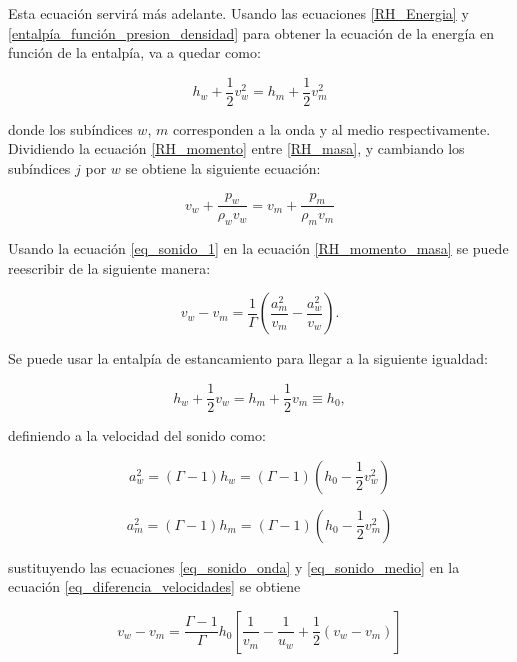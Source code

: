 \documentclass[12pt,a4paper]{book}
\begin{document}
\noindent Esta ecuación servirá más adelante. Usando las ecuaciones  
\ref{RH_Energia} y \ref{entalpía_función_presion_densidad} para obtener la ecuación de la energía en función de la entalpía, va a quedar como:

\begin{equation}\label{RH_entalpía}
  h_w +\frac{1}{2}v_w^2 = h_m +\frac{1}{2}v_m^2
\end{equation} 

\noindent donde los subíndices $w$, $m$ corresponden a la onda y al medio respectivamente. Dividiendo la ecuación \ref{RH_momento} entre \ref{RH_masa}, y cambiando los 
subíndices $j$ por $w$ se obtiene la siguiente ecuación: 

\begin{equation} \label{RH_momento_masa}
  v_w + \frac{p_w}{\rho_w v_w} = v_m + \frac{p_m}{\rho_m v_m}
\end{equation}

\noindent Usando la ecuación \ref{eq_sonido_1} en la ecuación \ref{RH_momento_masa} se puede reescribir de 
la siguiente manera:

\begin{equation} \label{eq_diferencia_velocidades}
  v_w-v_m = \frac{1}{\Gamma} \left(\frac{a_m^2}{v_m} - \frac{a_w^2}{v_w} \right).
\end{equation}

Se puede usar la entalpía de estancamiento para llegar a la siguiente igualdad:

\begin{equation}
  h_w + \frac{1}{2} v_w = h_m + \frac{1}{2} v_m \equiv h_0,
\end{equation}

\noindent definiendo a la velocidad del sonido como:

\begin{equation} \label{eq_sonido_onda}
  a_w^2 = \left( \Gamma-1 \right) h_w = \left( \Gamma-1 \right) \left( h_0 -\frac{1}{2} v_w^2 \right)
\end{equation}

\begin{equation} \label{eq_sonido_medio}
  a_m^2 = \left( \Gamma-1 \right) h_m = \left( \Gamma-1 \right) \left( h_0 -\frac{1}{2} v_m^2 \right)
\end{equation}

\noindent sustituyendo las ecuaciones \ref{eq_sonido_onda} y \ref{eq_sonido_medio} en la ecuación \ref{eq_diferencia_velocidades}
se obtiene

\begin{equation}
  v_w-v_m = \frac{\Gamma - 1}{\Gamma} h_0 \left[ \frac{1}{v_m} - \frac{1}{u_w} + \frac{1}{2} \left( v_w - v_m\right) \right]
\end{equation}
\end{document}
